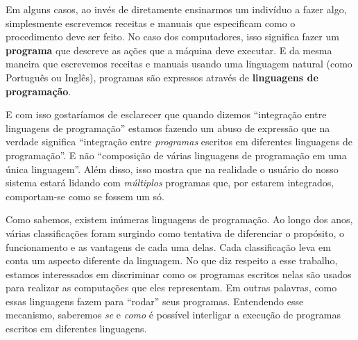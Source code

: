   Em alguns casos, ao invés de diretamente ensinarmos um indivíduo a fazer algo,
  simplesmente escrevemos receitas e manuais que especificam como o procedimento
  deve ser feito. No caso dos computadores, isso significa fazer um
  \textbf{programa} que descreve as ações que a máquina deve executar. E da
  mesma maneira que escrevemos receitas e manuais usando uma linguagem natural
  (como Português ou Inglês), programas são expressos através de
  \textbf{linguagens de programação}.


  E com isso gostaríamos de esclarecer que quando dizemos ``integração entre
  linguagens de programação'' estamos fazendo um abuso de expressão que na
  verdade significa ``integração entre \emph{programas} escritos em diferentes
  linguagens de programação''. E não ``composição de várias linguagens de
  programação em uma única linguagem''. Além disso, isso mostra que na realidade
  o usuário do nosso sistema estará lidando com \emph{múltiplos} programas que,
  por estarem integrados, comportam-se como se fossem um só.

  Como sabemos, existem inúmeras linguagens de programação. Ao longo dos anos,
  várias classificações foram surgindo como tentativa de diferenciar o
  propósito, o funcionamento e as vantagens de cada uma delas. Cada
  classificação leva em conta um aspecto diferente da linguagem. No que diz
  respeito a esse trabalho, estamos interessados em discriminar como os
  programas escritos nelas são usados para realizar as computações que eles
  representam. Em outras palavras, como essas linguagens fazem para ``rodar''
  seus programas. Entendendo esse mecanismo, saberemos \emph{se} e \emph{como} é
  possível interligar a execução de programas escritos em diferentes linguagens.

